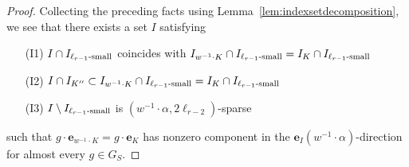 \documentclass{amsart}
\theoremstyle{plain}
\theoremstyle{definition}
\theoremstyle{remark}
\newcommand{\Vect}[1]{\mathbold{#1}}
\begin{document}
\begin{proof}
Collecting the preceding facts using Lemma~\ref{lem:indexsetdecomposition},
we see that there exists a set $I$ satisfying
\begin{itemize}
\item[(I1)] $I \cap I_{\textup{$\ell_{r - 1}$-small}}$ coincides with $I_{w ^{-1}\cdot K} \cap I_{\textup{$\ell_{r -
1}$-small}} = I_{K} \cap I_{\textup{$\ell_{r - 1}$-small}}$
\item[(I2)] $I \cap I_{K''} \subset I_{w ^{-1}\cdot K} \cap I_{\textup{$\ell_{r - 1}$-small}} = I_{K} \cap I_{\textup{$\ell_{r - 1}$-small}}$
\item[(I3)] $I \setminus I_{\textup{$\ell_{r - 1}$-small}}$ is $(w^{-1} \cdot \alpha,
2\ell_{r - 2})$-sparse
\end{itemize}
such that $g \cdot \Vect{e}_{w^{-1} \cdot K} = g \cdot \Vect{e}_{K}$ has nonzero
component in the $\Vect{e}_{I}(w ^{-1}\cdot \alpha)$-direction for almost every $g \in G_{S}$.


\end{proof}
\end{document}
